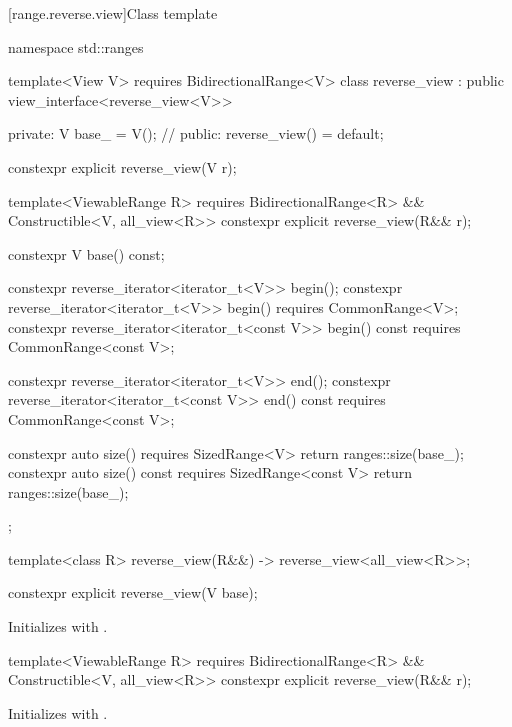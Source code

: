 [range.reverse.view]{Class template }

%
\begin{codeblock}
namespace std::ranges {
  template<View V>
    requires BidirectionalRange<V>
  class reverse_view : public view_interface<reverse_view<V>> {
  private:
    V base_ = V();  // \expos
  public:
    reverse_view() = default;

    constexpr explicit reverse_view(V r);

    template<ViewableRange R>
      requires BidirectionalRange<R> && Constructible<V, all_view<R>>
    constexpr explicit reverse_view(R&& r);

    constexpr V base() const;

    constexpr reverse_iterator<iterator_t<V>> begin();
    constexpr reverse_iterator<iterator_t<V>> begin() requires CommonRange<V>;
    constexpr reverse_iterator<iterator_t<const V>> begin() const
      requires CommonRange<const V>;

    constexpr reverse_iterator<iterator_t<V>> end();
    constexpr reverse_iterator<iterator_t<const V>> end() const
      requires CommonRange<const V>;

    constexpr auto size() requires SizedRange<V> {
      return ranges::size(base_);
    }
    constexpr auto size() const requires SizedRange<const V> {
      return ranges::size(base_);
    }
  };

  template<class R>
    reverse_view(R&&) -> reverse_view<all_view<R>>;
}
\end{codeblock}

%
\begin{itemdecl}
constexpr explicit reverse_view(V base);
\end{itemdecl}

\begin{itemdescr}
\pnum
\effects Initializes  with .
\end{itemdescr}

%
\begin{itemdecl}
template<ViewableRange R>
  requires BidirectionalRange<R> && Constructible<V, all_view<R>>
constexpr explicit reverse_view(R&& r);
\end{itemdecl}

\begin{itemdescr}
\pnum
\effects Initializes  with .
\end{itemdescr}

